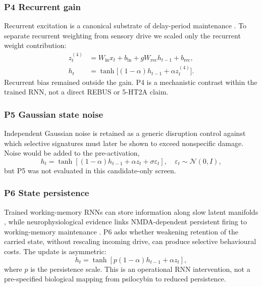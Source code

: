 \documentclass[11pt,reprint,aps,prl,floatfix,secnumarabic]{revtex4-2}
\begin{document}
\subsubsection{P4 Recurrent gain}
Recurrent excitation is a canonical substrate of delay-period maintenance
\cite{wang2013nmda}. To separate recurrent weighting from sensory drive we
scaled only the recurrent weight contribution:
\begin{equation}
\begin{aligned}
 z_t^{(4)} &=
 W_{\mathrm{in}}x_t+b_{\mathrm{in}}
 +g W_{\mathrm{rec}}h_{t-1}+b_{\mathrm{rec}},\\
 h_t &= \tanh\bigl[(1-\alpha)h_{t-1}+\alpha z_t^{(4)}\bigr].
\end{aligned}
 \label{eq:p4}
\end{equation}
Recurrent bias remained outside the gain. P4 is a mechanistic contrast within
the trained RNN, not a direct REBUS or 5-HT2A claim.

\subsubsection{P5 Gaussian state noise}
Independent Gaussian noise is retained as a generic disruption control against
which selective signatures must later be shown to exceed nonspecific damage.
Noise would be added to the pre-activation,
\begin{equation}
 h_t=\tanh\!\left[
 (1-\alpha)h_{t-1}+\alpha z_t+\sigma\varepsilon_t
 \right],
 \quad \varepsilon_t\sim\mathcal{N}(0,I),
 \label{eq:p5}
\end{equation}
but P5 was not evaluated in this candidate-only screen.

\subsubsection{P6 State persistence}
Trained working-memory RNNs can store information along slow latent manifolds
\cite{ghazizadeh2021}, while neurophysiological evidence links NMDA-dependent
persistent firing to working-memory maintenance \cite{wang2013nmda}. P6 asks
whether weakening retention of the carried state, without rescaling incoming
drive, can produce selective behavioural costs. The update is asymmetric:
\begin{equation}
 h_t=\tanh\!\left[p(1-\alpha)h_{t-1}+\alpha z_t\right],
 \label{eq:persistence}
\end{equation}
where $p$ is the persistence scale. This is an operational RNN intervention,
not a pre-specified biological mapping from psilocybin to reduced persistence.
\end{document}
